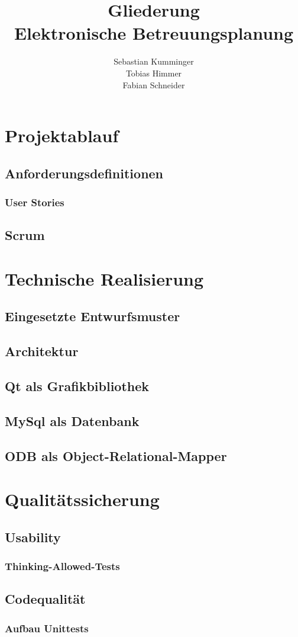 \documentclass[a4paper,10pt]{article}
\title{Gliederung \\ Elektronische Betreuungsplanung}
\author{Sebastian Kumminger \\
	Tobias Himmer \\
	Fabian Schneider}
\begin{document}
\maketitle

\section{Projektablauf}
\subsection{Anforderungsdefinitionen}
\subsubsection{User Stories}
\subsection{Scrum}

\section{Technische Realisierung}
\subsection{Eingesetzte Entwurfsmuster}
\subsection{Architektur}
\subsection{Qt als Grafikbibliothek}
\subsection{MySql als Datenbank}
\subsection{ODB als Object-Relational-Mapper}


\section{Qualitätssicherung}
\subsection{Usability}
\subsubsection{Thinking-Allowed-Tests}
\subsection{Codequalität} 
\subsubsection{Aufbau Unittests}
\end{document}
